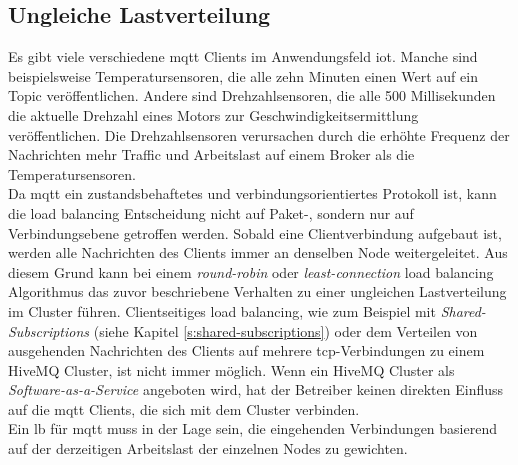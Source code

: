 \subsection{Ungleiche Lastverteilung} \label{sp:load}
Es gibt viele verschiedene \ac{mqtt} Clients im Anwendungsfeld \ac{iot}.
Manche sind beispielsweise Temperatursensoren, die alle zehn Minuten einen Wert auf ein Topic veröffentlichen.
Andere sind Drehzahlsensoren, die alle 500 Millisekunden die aktuelle Drehzahl eines Motors zur Geschwindigkeitsermittlung veröffentlichen.
Die Drehzahlsensoren verursachen durch die erhöhte Frequenz der Nachrichten mehr Traffic und Arbeitslast auf einem Broker als die Temperatursensoren.
\\
Da \ac{mqtt} ein zustandsbehaftetes und verbindungsorientiertes Protokoll ist, kann die load balancing Entscheidung nicht auf Paket-, sondern nur auf Verbindungsebene getroffen werden. Sobald eine Clientverbindung aufgebaut ist, werden alle Nachrichten des Clients immer an denselben Node weitergeleitet.
Aus diesem Grund kann bei einem \textit{round-robin} oder \textit{least-connection} load balancing Algorithmus das zuvor beschriebene Verhalten zu einer ungleichen Lastverteilung im Cluster führen.
Clientseitiges load balancing, wie zum Beispiel mit \textit{Shared-Subscriptions} (siehe Kapitel \ref{s:shared-subscriptions}) oder dem Verteilen von ausgehenden Nachrichten des Clients auf mehrere \ac{tcp}-Verbindungen zu einem HiveMQ Cluster, ist nicht immer möglich. Wenn ein HiveMQ Cluster als \textit{Software-as-a-Service} angeboten wird, hat der Betreiber keinen direkten Einfluss auf die \ac{mqtt} Clients, die sich mit dem Cluster verbinden.
\\
Ein \acl{lb} für \ac{mqtt} muss in der Lage sein, die eingehenden Verbindungen basierend auf der derzeitigen Arbeitslast der einzelnen Nodes zu gewichten.

\newpage
